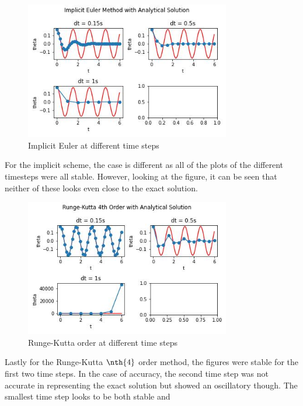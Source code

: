\documentclass{article}
\begin{document}
		\begin{figure}[H]
			\centering
			\includegraphics[width=0.8\textwidth]{images/imp3a.jpg}
			\caption{\label{} Implicit Euler at different time steps }
		\end{figure}
		For the implicit scheme, the case is different as all of the plots of the different timesteps were all stable. However, looking at the figure, it can be seen that neither of these looks even close to the exact solution.
		\begin{figure}[H]
			\centering
			\includegraphics[width=0.8\textwidth]{images/rk43a.jpg}
			\caption{\label{} Runge-Kutta  order at different time steps}
		\end{figure}
		Lastly for the Runge-Kutta $\nth{4}$ order method, the figures were stable for the first two time steps. In the case of accuracy, the second time step was not accurate in representing the exact solution but showed an oscillatory though. The smallest time step looks to be both stable and 
\end{document}
